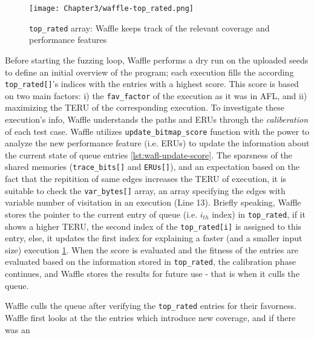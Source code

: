 \begin{figure}[!b]
  \texttt{[image: Chapter3/waffle-top\_rated.png]}
  \centering
  \caption{\texttt{top\_rated} array: Waffle keeps track of the relevant coverage and performance features}
  \label{fig:waffle-top_rated}
\end{figure}


Before starting the fuzzing loop, Waffle performs a dry run on the uploaded seeds to define an initial overview of the program; each execution fills the according \texttt{top\_rated[]}'s indices with the entries with a highest score. This score is based on two main factors: i) the \texttt{fav\_factor} of the execution as it was in AFL, and ii) maximizing the TERU of the corresponding execution. To investigate these execution's info, Waffle understands the paths and ERUs through the \textit{caliberation} of each test case. Waffle utilizes \texttt{update\_bitmap\_score} function with the power to analyze the new performance feature (i.e. ERUs) to update the information about the current state of queue entries \ref{lst:wafl-update-score}. The sparsness of the shared memories (\texttt{trace\_bits[]} and \texttt{ERUs[]}), and an expectation based on the fact that the repitition of same edges increases the TERU of execution, it is suitable to check the \texttt{var\_bytes[]} array, an array specifying the edges with variable number of visitation in an execution (Line 13). Briefly speaking, Waffle stores the pointer to the current entry of queue (i.e. $i_{th}$ index) in \texttt{top\_rated}, if it shows a higher TERU, the second index of the \texttt{top\_rated[i]} is assigned to this entry, else, it updates the first index for explaining a faster (and a smaller input size) execution \ref{fig:waffle-top_rated}. When the score is evaluated and the fitness of the entries are evaluated based on the information stored in \texttt{top\_rated}, the calibration phase continues, and Waffle stores the results for future use - that is when it culls the queue. 




Waffle culls the queue after verifying the \texttt{top\_rated} entries for their favorness. Waffle first looks at the the entries which introduce new coverage, and if there was an 
